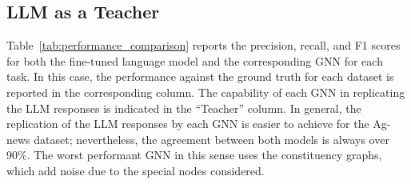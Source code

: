 \documentclass[preprint, times, review, 10pt]{elsarticle}
\begin{document}
\subsection{LLM as a Teacher} \label{sec:llm_teacher}

Table~\ref{tab:performance_comparison} reports the precision, recall, and F1 scores for both the fine-tuned language model and the corresponding GNN for each task. In this case, the performance against the ground truth for each dataset is reported in the corresponding column. The capability of each GNN in replicating the LLM responses is indicated in the “Teacher” column. In general, the replication of the LLM responses by each GNN is easier to achieve for the Ag-news dataset; nevertheless, the agreement between both models is always over 90\%. The worst performant GNN in this sense uses the constituency graphs, which add noise due to the special nodes considered.
\end{document}
